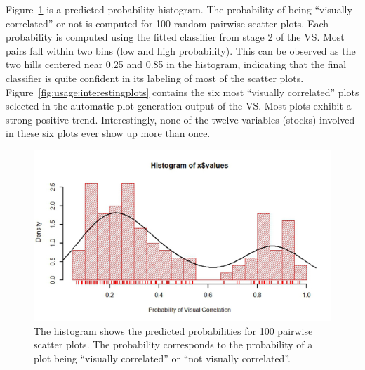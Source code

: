 \newpage
Figure~\ref{fig:usage:hist} is a predicted probability histogram. The 
probability of being ``visually correlated'' or not is computed for 100 random 
pairwise scatter plots. Each probability is computed using the fitted 
classifier from stage 2 of the VS. Most pairs fall within two 
bins (low and high probability). This can be observed as the two hills centered 
near 0.25 and 0.85 in the histogram, indicating that the final classifier is 
quite confident in its labeling of most of the scatter plots.
Figure~\ref{fig:usage:interestingplots} contains the six most ``visually 
correlated'' plots 
selected in the automatic plot generation output of the VS. Most 
plots exhibit a strong positive trend. Interestingly, none of the twelve 
variables (stocks) involved in these six plots ever show up more than once. 

\begin{figure}[htb]
	\begin{center}
		\includegraphics[width=1\linewidth]
		{ch-usage/figures/predicted_probability_histogram}
		\caption[Histogram of predicted probabilities.]{The histogram shows the 
		predicted probabilities for 100 pairwise scatter plots. The 
		probability corresponds to the probability of a plot being 
		``visually correlated'' or ``not visually correlated''.}
		\label{fig:usage:hist}
	\end{center}
\end{figure}

